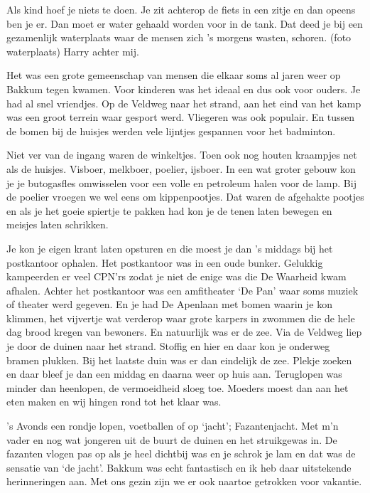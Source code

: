 \documentclass[10pt,twoside, openright]{memoir}
\begin{document}
Als kind hoef je niets te doen. Je zit achterop de fiets in een zitje en dan opeens ben je er. Dan moet er water gehaald worden voor in de tank. Dat deed je bij een gezamenlijk waterplaats waar de mensen zich ’s morgens wasten, schoren.  
(foto waterplaats) Harry achter mij.

Het was een grote gemeenschap van mensen die elkaar soms al jaren weer op Bakkum tegen kwamen.  Voor kinderen was het ideaal en dus ook voor ouders. Je had al snel vriendjes. Op de Veldweg naar het strand, aan het eind van het kamp was een groot terrein waar gesport werd. Vliegeren was ook populair. En tussen de bomen bij de huisjes werden vele lijntjes gespannen voor het badminton.

Niet ver van de ingang waren de winkeltjes. Toen ook nog houten kraampjes net als de huisjes. Visboer, melkboer, poelier, ijsboer. In een wat groter gebouw kon je je butogasfles omwisselen voor een volle en petroleum halen voor de lamp. Bij de poelier vroegen we wel eens om kippenpootjes. Dat waren de afgehakte pootjes en als je het goeie spiertje te pakken had kon je de tenen laten bewegen en meisjes laten schrikken.

Je kon je eigen krant laten opsturen en die moest je dan ’s middags bij het postkantoor ophalen. Het postkantoor was in een oude bunker. Gelukkig kampeerden er veel CPN’rs zodat je niet de enige was die De Waarheid kwam afhalen. Achter het postkantoor was een amfitheater ‘De Pan’ waar soms muziek of theater werd gegeven. En je had De Apenlaan met bomen waarin je kon klimmen, het vijvertje wat verderop waar grote karpers in zwommen die de hele dag brood kregen van bewoners.
En natuurlijk was er de zee. Via de Veldweg liep je door de duinen naar het strand. Stoffig en hier en daar kon je onderweg bramen plukken. Bij het laatste duin was er dan eindelijk de zee. Plekje zoeken en daar bleef je dan een middag en daarna weer op huis aan. Teruglopen was minder dan heenlopen, de vermoeidheid sloeg toe. Moeders moest dan aan het eten maken en wij hingen rond tot het klaar was. 

’s Avonds een rondje lopen, voetballen of op ‘jacht’; Fazantenjacht. Met m’n vader en nog wat jongeren uit de buurt de duinen en het struikgewas in. De fazanten vlogen pas op als je heel dichtbij was en je schrok je lam en dat was de sensatie van ‘de jacht’.
Bakkum was echt fantastisch en ik heb daar uitstekende herinneringen aan. Met ons gezin zijn we er ook naartoe getrokken voor vakantie.
\end{document}
